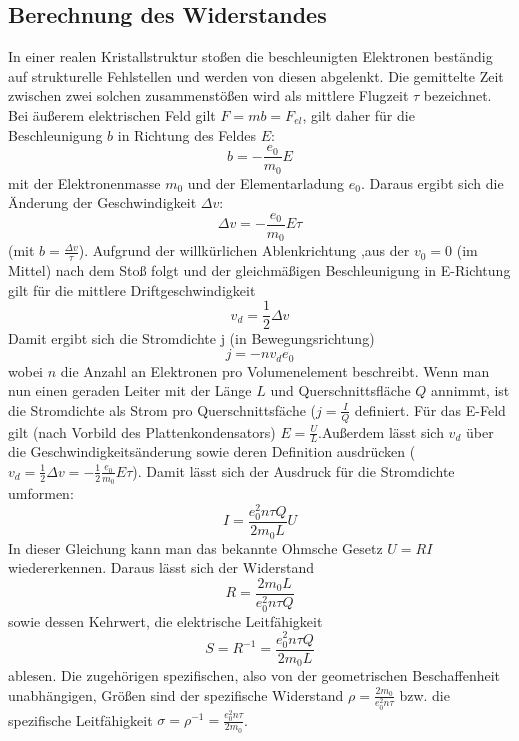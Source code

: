 \subsection{Berechnung des Widerstandes}
In einer realen Kristallstruktur stoßen die beschleunigten Elektronen beständig auf strukturelle Fehlstellen und werden von diesen abgelenkt. Die gemittelte Zeit zwischen zwei solchen zusammenstößen wird als mittlere Flugzeit $\tau$ bezeichnet.       
Bei äußerem elektrischen Feld gilt $F=mb=F_{el}$, gilt daher für die Beschleunigung $b$ in Richtung des Feldes $E$:
\begin{equation*}
b=-\frac{e_0}{m_0}E
\end{equation*}
mit der Elektronenmasse $m_0$ und der Elementarladung $e_0$. Daraus ergibt sich die Änderung der Geschwindigkeit $\Delta v$:
\begin{equation}
\Delta v=-\frac{e_0}{m_0}E\tau
\end{equation}
(mit $b=\frac{\Delta v}{\tau}$). Aufgrund der willkürlichen Ablenkrichtung ,aus der  $v_0=0$ (im Mittel) nach dem Stoß folgt und der gleichmäßigen Beschleunigung in E-Richtung gilt für die mittlere Driftgeschwindigkeit
\begin{equation}
v_d=\frac{1}{2}\Delta v
\end{equation} 
Damit ergibt sich die Stromdichte j (in Bewegungsrichtung) 
\begin{equation}
j=-nv_de_0
\end{equation}
wobei $n$ die Anzahl an Elektronen pro Volumenelement beschreibt. Wenn man nun einen geraden Leiter mit der Länge $L$ und Querschnittsfläche $Q$ annimmt, ist die Stromdichte als Strom pro Querschnittsfäche ($j=\frac{I}{Q}$ definiert. Für das E-Feld gilt (nach Vorbild des Plattenkondensators) $E=\frac{U}{L}$.Außerdem lässt sich $v_d$ über die Geschwindigkeitsänderung sowie deren Definition ausdrücken ($v_d=\frac{1}{2}\Delta v=-\frac{1}{2}\frac{e_0}{m_0}E\tau$). Damit lässt sich der Ausdruck für die Stromdichte umformen:
\begin{equation}
I=\frac{e_0^2n\tau Q}{2m_0L}U
\end{equation}
In dieser Gleichung kann man das bekannte Ohmsche Gesetz $U=RI$ wiedererkennen. Daraus lässt sich der Widerstand
\begin{equation}
R=\frac{2m_0L}{e_0^2n\tau Q}
\end{equation}
sowie dessen Kehrwert, die elektrische Leitfähigkeit
\begin{equation}
S=R^{-1}=\frac{e_0^2n\tau Q}{2m_0L}
\end{equation}
ablesen. Die zugehörigen spezifischen, also von der geometrischen Beschaffenheit unabhängigen, Größen sind der spezifische Widerstand $\rho=\frac{2m_0}{e_0^2n\tau}$ bzw. die spezifische Leitfähigkeit $\sigma=\rho^{-1}=\frac{e_0^2n\tau}{2m_0}$.
